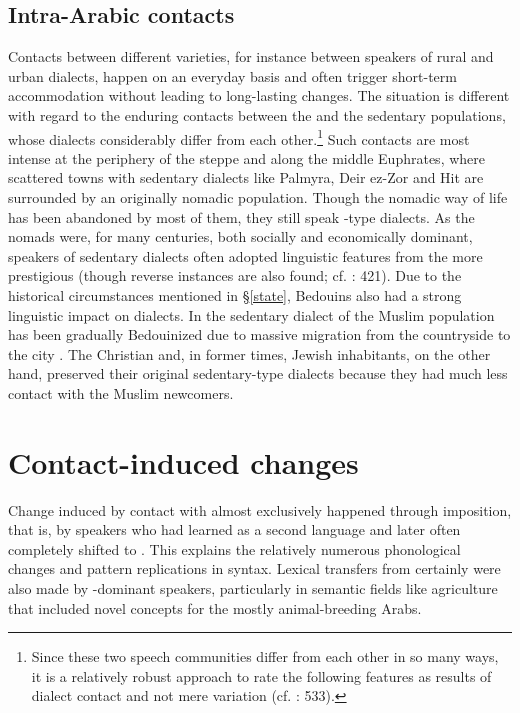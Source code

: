 \documentclass[output=paper]{langsci/langscibook}
\begin{document}
  \subsection{Intra-Arabic contacts} 

Contacts between different  varieties, for instance between speakers of rural and urban dialects, happen on an everyday basis and often trigger short-term {accommodation} without leading to long-lasting changes. The situation is different with regard to the enduring contacts between the  and the sedentary populations, whose dialects considerably differ from each other.\footnote{Since these two speech communities differ from each other in so many ways, it is a relatively robust approach to rate the following features as results of {dialect contact} and not mere variation (cf. \citealt{Lucas2015}: 533).} Such contacts are most intense at the periphery of the  steppe and along the middle Euphrates, where scattered towns with sedentary dialects like Palmyra, Deir ez-Zor and Hit are surrounded by an originally nomadic population. Though the nomadic way of life has been abandoned by most of them, they still speak -type  dialects. As the nomads were, for many centuries, both socially and economically dominant, speakers of sedentary dialects often adopted linguistic features from the more {prestigious}  (though reverse instances are also found; cf. \citealt{Behnstedt1994Dialektkontakt}: 421). Due to the historical circumstances mentioned in §\ref{state}, Bedouins also had a strong linguistic impact on  dialects. In  the sedentary dialect of the Muslim population has been gradually Bedouinized due to massive migration from the countryside to the city \citep{Palva2009}. The Christian and, in former times, Jewish inhabitants, on the other hand, preserved their original sedentary-type dialects because they had much less contact with the Muslim newcomers. 

\section{Contact-induced changes} 

Change induced by contact with  almost exclusively happened through {imposition}, that is, by  speakers who had learned  as a second language and later often completely shifted to . This explains the relatively numerous phonological changes and pattern replications in syntax. Lexical transfers from  certainly were also made by -dominant speakers, particularly in semantic fields like agriculture that included novel concepts for the mostly animal-breeding Arabs.
\end{document}
